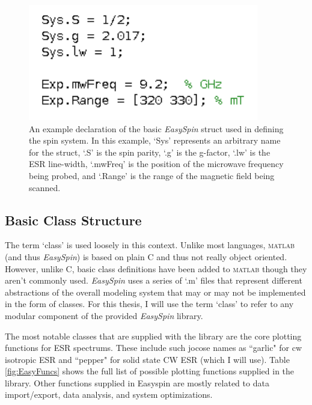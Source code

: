 \documentclass[oneside, astronomy, noacknowlegments]{BYUPhys}
\begin{document}
\begin{figure}
    \centerline{\includegraphics{example_params_fig}}
    \caption[Simple Spin System Definition]{\label{fig:SpinDefinition}
     An example declaration of the basic \textit{EasySpin} struct used in defining the spin system. In this example, `Sys' represents an arbitrary name for the struct, `.S' is the spin parity, `.g' is the g-factor, `.lw' is the ESR line-width, `.mwFreq' is the position of the microwave frequency being probed, and `.Range' is the range of the magnetic field being scanned.}
 \end{figure}

\subsection{Basic Class Structure}

The term `class' is used loosely in this context. Unlike most languages, \textsc{matlab} (and thus \textit{EasySpin}) is based on plain C and thus not really object oriented. However, unlike C, basic class definitions have been added to \textsc{matlab} though they aren't commonly used. \textit{EasySpin} uses a series of `.m' files that represent different abstractions of the overall modeling system that may or may not be implemented in the form of classes. For this thesis, I will use the term `class' to refer to any modular component of the provided \textit{EasySpin} library.

The most notable classes that are supplied with the library are the core plotting functions for ESR spectrums. These include such jocose names as ``garlic" for cw isotropic ESR and ``pepper" \cite{RefWorks:doc:589299f4e4b0d4c09201f915} for solid state CW ESR (which I will use). Table \ref{fig:EasyFuncs} shows the full list of possible plotting functions supplied in the library. Other functions supplied in Easyspin are mostly related to data import/export, data analysis, and system optimizations.
\end{document}
